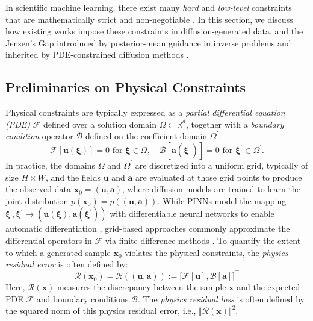 \documentclass{article}
\theoremstyle{plain}
\theoremstyle{definition}
\theoremstyle{remark}
\def\va{{\bm{a}}}
\def\vu{{\bm{u}}}
\def\vx{{\bm{x}}}
\begin{document}
In scientific machine learning, there exist many \textit{hard} and \textit{low-level} constraints that are mathematically strict and non-negotiable \cite{leveque1992numerical, hansen2023learning, mouli2024using, saad2022guiding}. In this section, we discuss how existing works impose these constraints in diffusion-generated data, and the Jensen's Gap introduced by posterior-mean guidance in inverse problems \cite{chung2022dps} and inherited by PDE-constrained diffusion methods \cite{bastek2025pdim, huang2024diffusionpde}.

\subsection{Preliminaries on Physical Constraints}

Physical constraints are typically expressed as a \textit{partial differential equation (PDE)} $\mathcal{F}$ defined over a solution domain $\Omega \subset \mathbb{R}^d$, together with a \textit{boundary condition} operator $\mathcal{B}$ defined on the coefficient domain $\Omega^\prime$:
\begin{equation}
\mathcal{F}[\mathbf{u}(\boldsymbol{\xi})] = 0 \text{ for } \boldsymbol{\xi} \in \Omega, \quad \mathcal{B}[\mathbf{a}(\boldsymbol{\xi^\prime})] = 0 \text{ for } \boldsymbol{\xi^\prime} \in \Omega^\prime.
\end{equation}
In practice, the domains $\Omega$ and $\Omega^\prime$ are discretized into a uniform grid, typically of size $H \times W$, and the fields $\vu$ and $\va$ are evaluated at those grid points to produce the observed data $\vx_0=(\vu,\va)$, where diffusion models are trained to learn the joint distribution $p(\vx_0) = p((\vu, \va))$. While PINNs \cite{raissi2019pinn} model the mapping $\boldsymbol{\xi}\,,\boldsymbol{\xi^\prime} \mapsto (\mathbf{u}(\boldsymbol{\xi}),\mathbf{a}(\boldsymbol{\xi^\prime}))$ with differentiable neural networks to enable automatic differentiation \cite{paszke2019pytorch, abadi2016tensorflow}, grid-based approaches commonly approximate the differential operators in $\mathcal{F}$ via finite difference methods \cite{smith1985fem, leveque2007fem}. To quantify the extent to which a generated sample $\vx_0$ violates the physical constraints, the \textit{physics residual error} is often defined by:
\begin{equation}
\mathcal{R}(\vx_0)= \mathcal{R}((\vu, \va)):=
\big[
\mathcal{F}[\vu],
\mathcal{B}[\va]\big]^\top
\end{equation}
Here, $\mathcal{R}(\vx)$ measures the discrepancy between the sample $\vx$ and the expected PDE $\mathcal{F}$ and boundary conditions $\mathcal{B}$. The \textit{physics residual loss} is often defined by the squared norm of this physics residual error, i.e., $\Vert\mathcal{R}(\vx)\Vert^2$.
\end{document}
